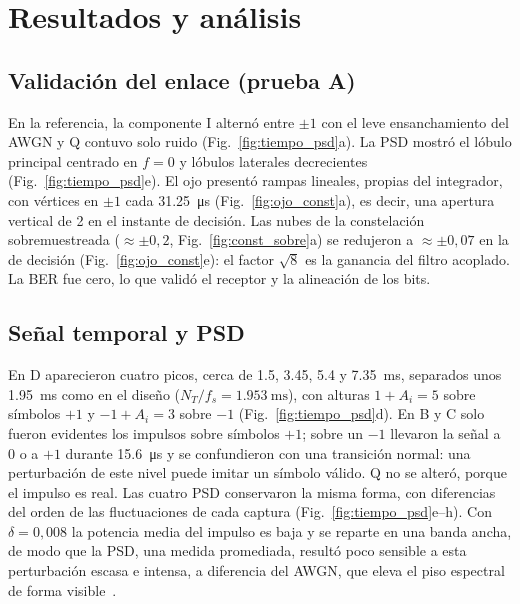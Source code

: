 \section{Resultados y análisis}\label{sec:resultados}

\subsection{Validación del enlace (prueba A)}\label{subsec:validacion}

En la referencia, la componente I alternó entre $\pm1$ con el leve
ensanchamiento del AWGN y Q contuvo solo ruido (Fig.~\ref{fig:tiempo_psd}a). La
PSD mostró el lóbulo principal centrado en $f=0$ y lóbulos laterales
decrecientes (Fig.~\ref{fig:tiempo_psd}e). El ojo presentó rampas lineales,
propias del integrador, con vértices en $\pm1$ cada \SI{31,25}{\micro\second}
(Fig.~\ref{fig:ojo_const}a), es decir, una apertura vertical de 2 en el
instante de decisión. Las nubes de la constelación sobremuestreada
($\approx\pm0{,}2$, Fig.~\ref{fig:const_sobre}a) se redujeron a
$\approx\pm0{,}07$ en la de decisión (Fig.~\ref{fig:ojo_const}e): el factor
$\sqrt8$ es la ganancia del filtro acoplado. La BER fue cero, lo que validó el
receptor y la alineación de los bits.

\subsection{Señal temporal y PSD}\label{subsec:res_tiempo_psd}

En D aparecieron cuatro picos, cerca de \num{1,5}, \num{3,45}, \num{5,4} y
\SI{7,35}{\milli\second}, separados unos \SI{1,95}{\milli\second} como en el
diseño ($N_T/f_s=\SI{1,953}{\milli\second}$), con alturas $1+A_i=5$ sobre símbolos $+1$ y $-1+A_i=3$ sobre $-1$
(Fig.~\ref{fig:tiempo_psd}d). En B y C solo fueron evidentes los impulsos sobre
símbolos $+1$; sobre un $-1$ llevaron la señal a 0 o a $+1$ durante
\SI{15,6}{\micro\second} y se confundieron con una transición normal: una
perturbación de este nivel puede imitar un símbolo válido. Q no se alteró,
porque el impulso es real. Las cuatro PSD conservaron la misma forma, con
diferencias del orden de las fluctuaciones de cada captura
(Fig.~\ref{fig:tiempo_psd}e--h). Con $\delta=0{,}008$ la potencia media del
impulso es baja y se reparte en una banda ancha, de modo que la PSD, una medida
promediada, resultó poco sensible a esta perturbación escasa e intensa, a diferencia del
AWGN, que eleva el piso espectral de forma visible~\cite{middleton1977,pighi2009}.

